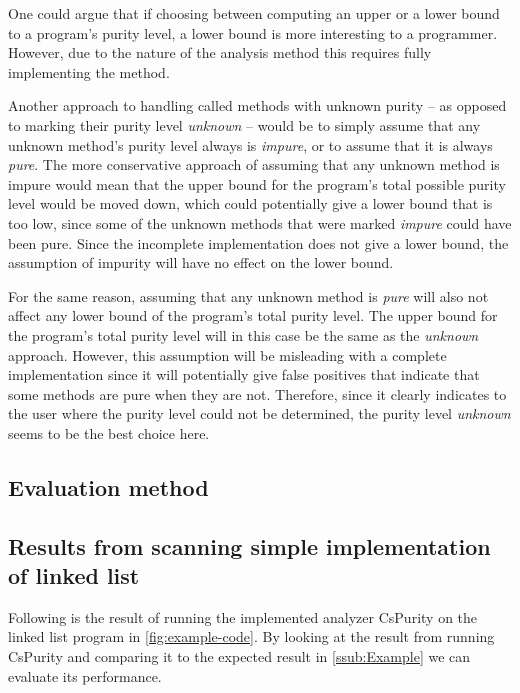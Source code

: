 \documentclass[a4paper,12pt]{article}
\begin{document}
One could argue that if choosing between computing an upper or a lower bound to a program's purity level, a lower bound is more interesting to a programmer. However, due to the nature of the analysis method this requires fully implementing the method.

Another approach to handling called methods with unknown purity -- as opposed to marking their purity level \textit{unknown} -- would be to simply assume that any unknown method's purity level always is \textit{impure}, or to assume that it is always \textit{pure}. The more conservative approach of assuming that any unknown method is impure would mean that the upper bound for the program's total possible purity level would be moved down, which could potentially give a lower bound that is too low, since some of the unknown methods that were marked \textit{impure} could have been pure. Since the incomplete implementation does not give a lower bound, the assumption of impurity will have no effect on the lower bound.

For the same reason, assuming that any unknown method is \textit{pure} will also not affect any lower bound of the program's total purity level. The upper bound for the program's total purity level will in this case be the same as the \textit{unknown} approach. However, this assumption will be misleading with a complete implementation since it will potentially give false positives that indicate that some methods are pure when they are not. Therefore, since it clearly indicates to the user where the purity level could not be determined, the purity level \textit{unknown} seems to be the best choice here.

\subsection{Evaluation method} \label{sub:evaluation-method}

\subsection{Results from scanning simple implementation of linked list} \label{sub:results-from-scanning-the-example-list}
Following is the result of running the implemented analyzer CsPurity on the linked list program in \autoref{fig:example-code}. By looking at the result from running CsPurity and comparing it to the expected result in \autoref{ssub:Example} we can evaluate its performance.
\end{document}
